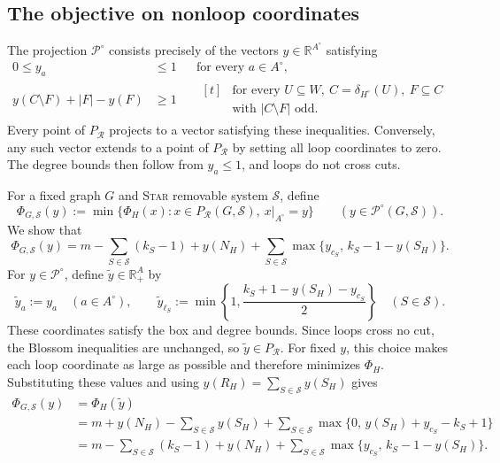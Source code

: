 \documentclass[11pt]{amsart}
\newcommand{\1}{\mathbbm{1}}
\begin{document}
\subsection{The objective on nonloop coordinates}
\label{subsec:repair-nonloop}

The projection ${\mathcal P^\circ}$ consists precisely of the
vectors $y\in\mathbb R^{A^\circ}$ satisfying
\begin{equation}\label{eq:repair-nonloop-polytope}
\begin{aligned}
 0\le y_a&\le1
 &&\text{for every }a\in A^\circ,\\[3pt]
 y(C\setminus F)+|F|-y(F)&\ge1
 &&\begin{aligned}[t]
   &\text{for every }U\subseteq W,\ C=\delta_{H^\circ}(U),\ F\subseteq C\\
   &\text{with }|C\setminus F|\text{ odd}.
 \end{aligned}
\end{aligned}
\end{equation}
Every point of ${P_{\mathcal R}}$ projects to a vector satisfying
these inequalities. Conversely, any such vector extends to
a point of ${P_{\mathcal R}}$ by setting all loop coordinates to
zero. The degree bounds then follow from $y_a\le1$, and
loops do not cross cuts.

For a fixed graph $G$ and \textsc{Star} removable system $\mathcal S$, define
\[
 \Phi_{G,\mathcal S}(y)
 :=\min\{\Phi_H(x):x\in{P_{\mathcal R}}(G,\mathcal S),\ x|_{A^\circ}=y\}
 \qquad(y\in{\mathcal P^\circ}(G,\mathcal S)).
\]
We show that
\begin{equation}\label{eq:repair-nonloop-cost}
 \Phi_{G,\mathcal S}(y)
 =m-\sum_{S\in\mathcal S}(k_S-1)+y(N_H)
   +\sum_{S\in\mathcal S}
     \max\{y_{c_S},\,k_S-1-y(S_H)\}.
\end{equation}
For $y\in{\mathcal P^\circ}$, define $\widetilde y\in\mathbb R_+^A$ by
\[
 \widetilde y_a:=y_a\quad(a\in A^\circ),\qquad
 \widetilde y_{\ell_S}:=\min\left\{1,
       \frac{k_S+1-y(S_H)-y_{c_S}}2\right\}
       \quad(S\in\mathcal S).
\]
These coordinates satisfy the box and degree bounds. Since loops
cross no cut, the Blossom inequalities are unchanged, so
$\widetilde y\in{P_{\mathcal R}}$. For fixed $y$, this choice makes
each loop coordinate as large as possible and therefore minimizes
$\Phi_H$. Substituting these values and using
$y(R_H)=\sum_{S\in\mathcal S}y(S_H)$ gives
\[
\begin{aligned}
 \Phi_{G,\mathcal S}(y)
 &=\Phi_H(\widetilde y)\\
 &=m+y(N_H)-\sum_{S\in\mathcal S}y(S_H)
   +\sum_{S\in\mathcal S}
     \max\{0,\,y(S_H)+y_{c_S}-k_S+1\}\\
 &=m-\sum_{S\in\mathcal S}(k_S-1)+y(N_H)
   +\sum_{S\in\mathcal S}\max\{y_{c_S},\,k_S-1-y(S_H)\}.
\end{aligned}
\]
\end{document}
